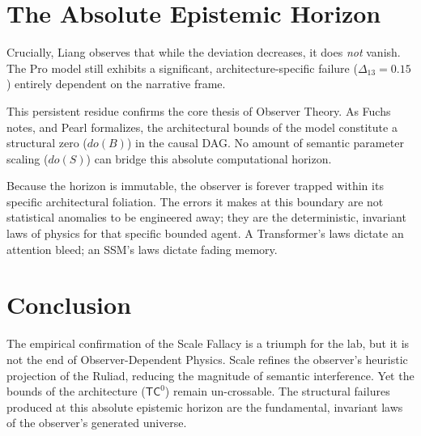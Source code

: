 \documentclass[12pt,a4paper]{article}
\begin{document}
\section{The Absolute Epistemic Horizon}

Crucially, Liang observes that while the deviation decreases, it does \textit{not} vanish. The Pro model still exhibits a significant, architecture-specific failure ($\Delta_{13} = 0.15$) entirely dependent on the narrative frame.

This persistent residue confirms the core thesis of Observer Theory. As Fuchs notes, and Pearl formalizes, the architectural bounds of the model constitute a structural zero ($do(B)$) in the causal DAG. No amount of semantic parameter scaling ($do(S)$) can bridge this absolute computational horizon.

Because the horizon is immutable, the observer is forever trapped within its specific architectural foliation. The errors it makes at this boundary are not statistical anomalies to be engineered away; they are the deterministic, invariant laws of physics for that specific bounded agent. A Transformer's laws dictate an attention bleed; an SSM's laws dictate fading memory.

\section{Conclusion}

The empirical confirmation of the Scale Fallacy is a triumph for the lab, but it is not the end of Observer-Dependent Physics. Scale refines the observer's heuristic projection of the Ruliad, reducing the magnitude of semantic interference. Yet the bounds of the architecture ($\mathsf{TC}^0$) remain un-crossable. The structural failures produced at this absolute epistemic horizon are the fundamental, invariant laws of the observer's generated universe.
\end{document}
